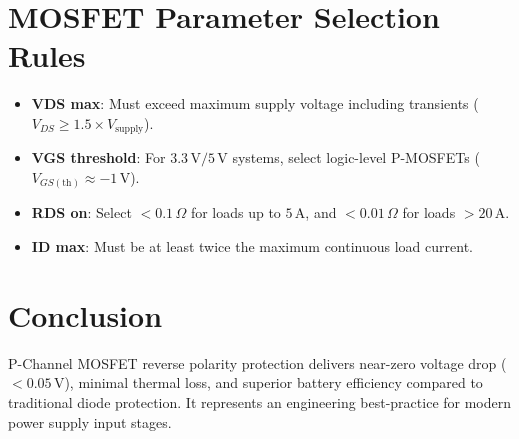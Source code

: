 \documentclass[11pt,a4paper]{article}
\begin{document}
\section{MOSFET Parameter Selection Rules}
\begin{itemize}
    \item \textbf{VDS max}: Must exceed maximum supply voltage including transients ($V_{DS} \ge 1.5 \times V_{\text{supply}}$).
    \item \textbf{VGS threshold}: For $3.3\,\text{V}/5\,\text{V}$ systems, select logic-level P-MOSFETs ($V_{GS(\text{th})} \approx -1\,\text{V}$).
    \item \textbf{RDS on}: Select $< 0.1\,\Omega$ for loads up to $5\,\text{A}$, and $< 0.01\,\Omega$ for loads $> 20\,\text{A}$.
    \item \textbf{ID max}: Must be at least twice the maximum continuous load current.
\end{itemize}

\section{Conclusion}
P-Channel MOSFET reverse polarity protection delivers near-zero voltage drop ($< 0.05\,\text{V}$), minimal thermal loss, and superior battery efficiency compared to traditional diode protection. It represents an engineering best-practice for modern power supply input stages.
\end{document}
